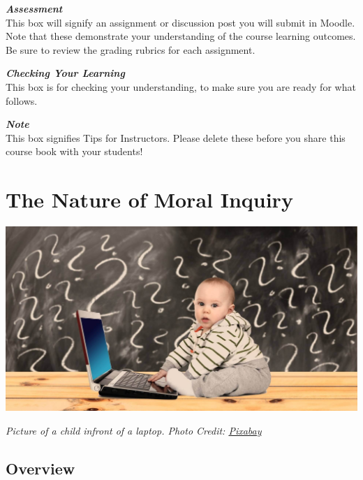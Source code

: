 \documentclass[
]{book}
\begin{document}
\begin{assessment}
\textbf{\emph{Assessment}}\\
This box will signify an assignment or discussion post you will submit in Moodle. Note that these demonstrate your understanding of the course learning outcomes. Be sure to review the grading rubrics for each assignment.
\end{assessment}

\begin{progress}
\textbf{\emph{Checking Your Learning}}\\
This box is for checking your understanding, to make sure you are ready for what follows.
\end{progress}

\begin{feedback}
\textbf{\emph{Note}}\\
This box signifies Tips for Instructors. Please delete these before you share this course book with your students!
\end{feedback}

\hypertarget{the-nature-of-moral-inquiry}{%
\chapter{The Nature of Moral Inquiry}\label{the-nature-of-moral-inquiry}}

\includegraphics{assets/unit_1/U1_baby-2709666_1920.jpg}

\emph{Picture of a child infront of a laptop. Photo Credit: \href{https://pixabay.com/en/baby-learn-laptop-question-2709666/}{Pixabay}}

\hypertarget{overview}{%
\section*{Overview}\label{overview}}
\end{document}
